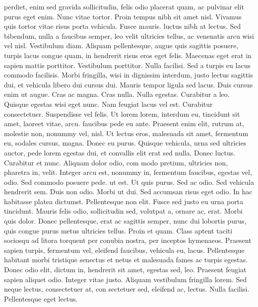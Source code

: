 \documentclass[10pt]{article}
\begin{document}
perdiet, enim sed gravida sollicitudin, felis odio placerat quam, ac pulvinar
elit purus eget enim. Nunc vitae tortor. Proin tempus nibh sit amet nisl.
Vivamus quis tortor vitae risus porta vehicula.
Fusce mauris.  luctus nibh at lectus. Sed bibendum, nulla
a faucibus semper, leo velit ultricies tellus, ac venenatis arcu wisi vel nisl.
Vestibulum diam. Aliquam pellentesque, augue quis sagittis posuere, turpis
lacus congue quam, in hendrerit risus eros eget felis. Maecenas eget erat in
sapien mattis porttitor. Vestibulum porttitor. Nulla facilisi. Sed a turpis eu
lacus commodo facilisis. Morbi fringilla, wisi in dignissim interdum, justo
lectus sagittis dui, et vehicula libero dui cursus dui. Mauris tempor ligula
sed lacus. Duis cursus enim ut augue. Cras ac magna. Cras nulla. Nulla
egestas. Curabitur a leo. Quisque egestas wisi eget nunc. Nam feugiat
lacus vel est. Curabitur consectetuer.
Suspendisse vel felis. Ut lorem lorem, interdum eu, tincidunt sit amet,
laoreet vitae, arcu.  faucibus pede eu ante. Praesent enim elit,
rutrum at, molestie non, nonummy vel, nisl. Ut lectus eros, malesuada sit
amet, fermentum eu, sodales cursus, magna. Donec eu purus. Quisque
vehicula, urna sed ultricies auctor, pede lorem egestas dui, et convallis elit
erat sed nulla. Donec luctus. Curabitur et nunc. Aliquam dolor odio, com
modo pretium, ultricies non, pharetra in, velit. Integer arcu est, nonummy
in, fermentum faucibus, egestas vel, odio.
Sed commodo posuere pede.  ut est. Ut quis purus. Sed ac odio.
Sed vehicula hendrerit sem. Duis non odio. Morbi ut dui. Sed accumsan
risus eget odio. In hac habitasse platea dictumst. Pellentesque non elit.
Fusce sed justo eu urna porta tincidunt. Mauris felis odio, sollicitudin sed,
volutpat a, ornare ac, erat. Morbi quis dolor. Donec pellentesque, erat ac
sagittis semper, nunc dui lobortis purus, quis congue purus metus ultricies
tellus. Proin et quam. Class aptent taciti sociosqu ad litora torquent per
conubia nostra, per inceptos hymenaeos. Praesent sapien turpis, fermentum
vel, eleifend faucibus, vehicula eu, lacus.
Pellentesque habitant morbi tristique senectus et netus et malesuada
fames ac turpis egestas. Donec odio elit, dictum in, hendrerit sit amet,
egestas sed, leo. Praesent feugiat sapien aliquet odio. Integer vitae justo.
Aliquam vestibulum fringilla lorem. Sed neque lectus, consectetuer at, con
sectetuer sed, eleifend ac, lectus. Nulla facilisi. Pellentesque eget lectus.
\end{document}
